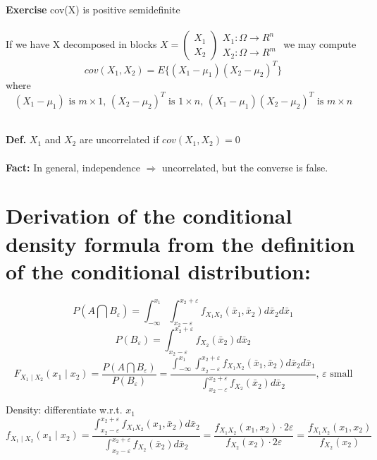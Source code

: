 \documentclass{article}
\begin{document}
        \noindent
        \textbf{Exercise} cov(X) is positive semidefinite \\ \\


        \noindent
        If we have X decomposed in blocks $X = \left( \begin{array}{cc} X_1 \\
                                               X_2 \end{array} \right)
                             \begin{array}{cc} X_1 : \Omega \rightarrow R^n \\
                                               X_2 : \Omega \rightarrow R^m \end{array}$
                                               we may compute $$cov(X_1,X_2)=E\{(X_1-\mu_1)(X_2-\mu_2)^T\}$$ where $$(X_1-\mu_1) \mbox{ is }m\times 1 \mbox{, } (X_2-\mu_2)^T \mbox{ is }1\times n\mbox{, } (X_1-\mu_1)(X_2-\mu_2)^T \mbox{ is }m\times n$$

        \noindent
        \\
        \textbf{Def. }$X_1$ and $X_2$ are uncorrelated if $cov(X_1,X_2)=0$ \\ \\

        \noindent
        \textbf{Fact:} In general, independence $\Rightarrow$ uncorrelated, but the converse is false.

 \newpage


       \section{Derivation of the conditional density formula from the definition of the conditional distribution:}

        $$P(A\bigcap B_{\varepsilon})=\int^{x_1}_{-\infty}\int^{x_2+\varepsilon}_{x_2-\varepsilon}f_{X_1X_2}(\bar{x}_1,\bar{x}_2)d\bar{x}_2d\bar{x}_1 $$
        $$P(B_{\varepsilon})=\int^{x_2+\varepsilon}_{x_2-\varepsilon}f_{X_2}(\bar{x}_2)d\bar{x}_2 $$
        $$F_{X_1 \mid X_2}(x_1\mid x_2) = \frac{P(A\bigcap B_{\varepsilon})}{P(B_{\varepsilon})}
        =\frac{\int^{x_1}_{-\infty}\int^{x_2+\varepsilon}_{x_2-\varepsilon}f_{X_1X_2}(\bar{x}_1,\bar{x}_2)d\bar{x}_2d\bar{x}_1}
        {\int^{x_2+\varepsilon}_{x_2-\varepsilon}f_{X_2}(\bar{x}_2)d\bar{x}_2}\mbox{, } \varepsilon \mbox{ small}$$

        \noindent
        Density: differentiate w.r.t. $x_1$
        $$f_{X_1 \mid X_2}(x_1\mid x_2)
        =\frac{\int^{x_2+\varepsilon}_{x_2-\varepsilon}f_{X_1X_2}(x_1,\bar{x}_2)d\bar{x}_2}
        {\int^{x_2+\varepsilon}_{x_2-\varepsilon}f_{X_2}(\bar{x}_2)d\bar{x}_2}
        =\frac{f_{X_1X_2}(x_1,x_2)\cdot 2\varepsilon}{f_{X_2}(x_2)\cdot 2\varepsilon}
        =\frac{f_{X_1X_2}(x_1,x_2)}{f_{X_2}(x_2)}$$
\end{document}
